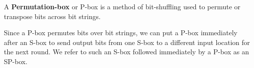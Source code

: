 \begin{defn}
A \textbf{Permutation-box} or P-box is a method of bit-shuffling used to permute
or transpose bits across bit strings.
\end{defn}

Since a P-box permutes bits over bit strings, we can put a P-box immediately
after an S-box to send output bits from one S-box to a different input location
for the next round. We refer to such an S-box followed immediately by a P-box
as an SP-box.
